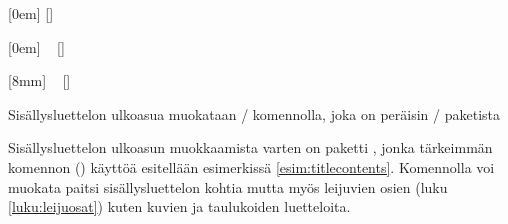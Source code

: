 \begin{esimerkki*}

\begin{koodilohko}
[0em]                                       %
{\addvspace{1.5ex}\rmfamily\bfseries\large} %
{\makebox[8mm][l]{\thecontentslabel}}       %
{}                                          %
{\small\titlerule[0bp]\contentspage}  %
[\addvspace{.5ex}]                    %

[0em]                                       %
{\addvspace{.5ex}\rmfamily\normalsize}      %
{\makebox[8mm][l]{\thecontentslabel}}       %
{}                                          %
{~\small{}\contentspage}   %
[\addvspace{.2ex}]                          %

[8mm]                                       %
{\rmfamily\small}                           %
{\makebox[10mm][l]{\thecontentslabel}}      %
{}                                          %
{~\small{}\contentspage}   %
[]                                          %
\end{koodilohko}
  \caption{Sisällysluettelon ulkoasua muokataan \-/
    komennolla, joka on peräisin \-/ paketista}
  \label{esim:titlecontents}
\end{esimerkki*}

Sisällysluettelon ulkoasun muokkaamista varten on paketti
, jonka tärkeimmän komennon
() käyttöä esitellään esimerkissä
\ref{esim:titlecontents}. Komennolla voi muokata paitsi
sisällysluettelon kohtia mutta myös leijuvien osien (luku
\ref{luku:leijuosat}) kuten kuvien ja taulukoiden luetteloita.

